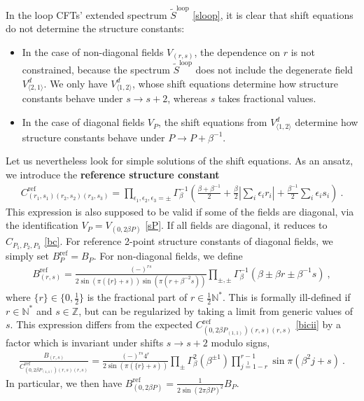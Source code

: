 \documentclass[12pt, a4paper]{article}
\theoremstyle{break}
\begin{document}
In the loop CFTs' extended spectrum $\widetilde{S}^\text{loop}$ \eqref{sloop}, it is clear that shift equations do not determine the structure constants:
\begin{itemize}
 \item In the case of non-diagonal fields $V_{(r,s)}$, the dependence on $r$ is not constrained, because the spectrum $\widetilde{S}^\text{loop}$ does not include the degenerate field $V_{\langle 2,1\rangle}^d$. We only have $V^d_{\langle 1,2\rangle}$, whose shift equations determine how structure constants behave under $s\to s+2$, whereas $s$ takes fractional values.
 \item In the case of diagonal fields $V_P$, the shift equations from $V^d_{\langle 1,2\rangle}$ determine how structure constants behave under $P\to P+\beta^{-1}$. 
\end{itemize}
Let us nevertheless look for simple solutions of the shift equations. As an ansatz, we introduce the \textbf{reference structure constant} 
\begin{align}
\boxed{C^\text{ref}_{(r_1,s_1)(r_2,s_2)(r_3,s_3)} =\prod_{\epsilon_1,\epsilon_2,\epsilon_3=\pm} \Gamma_\beta^{-1} \left(\tfrac{\beta+\beta^{-1}}{2} + \tfrac{\beta}{2}\left|\textstyle{\sum_i} \epsilon_ir_i\right| + \tfrac{\beta^{-1}}{2}\textstyle{\sum_i} \epsilon_is_i\right)}\ .
 \label{cref}
\end{align}
This expression is also supposed to be valid if some of the fields are diagonal, via the identification $V_P = V_{(0,2\beta P)}$ \eqref{sP}. If all fields are diagonal, it reduces to $C_{P_1,P_2,P_3}$ \eqref{bc}. 
For reference 2-point structure constants of diagonal fields, we simply set $B^\text{ref}_P = B_P$. For non-diagonal fields, we define 
\begin{align}
 \boxed{B^\text{ref}_{(r,s)} = \frac{(-)^{rs}}{2\sin\left(\pi(\{r\}+s)\right)\sin\left(\pi(r+\beta^{-2}s)\right)}\prod_{\pm,\pm}\Gamma_\beta^{-1}\left(\beta\pm \beta r \pm \beta^{-1}s\right)} \ ,
 \label{bref}
 \end{align}
 where $\{r\}\in\{0,\frac12\}$ is the fractional part of $r\in\frac12\mathbb{N}^*$. This is formally ill-defined if $r\in\mathbb{N}^*$ and $s\in\mathbb{Z}$, but can be regularized by taking a limit from generic values of $s$. This expression differs from the expected $C^\text{ref}_{(0,2\beta P_{(1,1)})(r,s)(r,s)}$ \eqref{bicii} by a factor which is invariant under shifts $s\to s+2$ modulo signs, 
 \begin{align}
  \frac{B_{(r,s)}}{C^\text{ref}_{(0,2\beta P_{(1,1)})(r,s)(r,s)}} = 
  \frac{(-)^{rs} 4^r}{2\sin\left(\pi(\{r\}+s)\right)}
  \prod_\pm \Gamma_\beta^{2}(\beta^{\pm 1})
  \prod_{j\overset{1}{=}1-r}^{r-1} \sin\pi(\beta^2j+s) \ .
 \end{align}
In particular, we then have $B^\text{ref}_{(0,2\beta P)} = \frac{1}{2\sin(2\pi\beta P)^2}B_P$.
\end{document}
